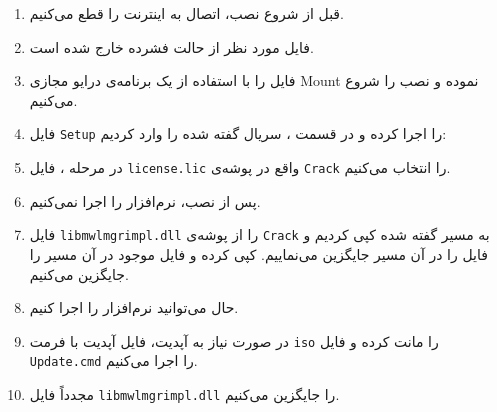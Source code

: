 \begin{enumerate}
	\item قبل از شروع نصب، اتصال به اینترنت را قطع می‌کنیم.
	\item فایل مورد نظر از حالت فشرده خارج شده است.
	\item فایل  را با استفاده از یک برنامه‌ی درایو مجازی Mount نموده و نصب را شروع می‌کنیم.
	\item فایل \texttt{Setup} را اجرا کرده و در قسمت ، سریال گفته شده را وارد کردیم:
	
	\item در مرحله ، فایل \texttt{license.lic} واقع در پوشه‌ی \texttt{Crack} را انتخاب می‌کنیم.
	\item پس از نصب، نرم‌افزار را اجرا نمی‌کنیم.
	\item فایل \texttt{libmwlmgrimpl.dll} را از پوشه‌ی \texttt{Crack} به مسیر گفته شده کپی کردیم و فایل را در آن مسیر جایگزین می‌نماییم.
	کپی کرده و فایل موجود در آن مسیر را جایگزین می‌کنیم.
	\item حال می‌توانید نرم‌افزار را اجرا کنیم.
	\item در صورت نیاز به آپدیت، فایل آپدیت با فرمت \texttt{iso} را مانت کرده و فایل \texttt{Update.cmd} را اجرا می‌کنیم.
	\item مجدداً فایل \texttt{libmwlmgrimpl.dll} را جایگزین می‌کنیم.
\end{enumerate}
